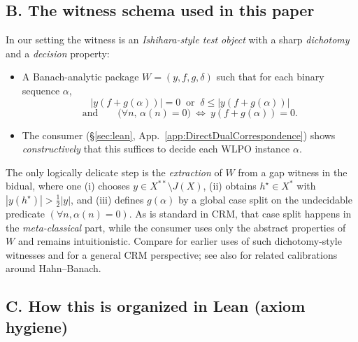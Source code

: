 \documentclass[11pt]{article}
\begin{document}
\subsection*{B. The witness schema used in this paper}

In our setting the witness is an \emph{Ishihara-style test object} with a sharp \emph{dichotomy} and a \emph{decision} property:
\begin{itemize}
\item A Banach-analytic package $W=(y,f,g,\delta)$ such that for each binary sequence $\alpha$,
\[
\big|y(f + g(\alpha))\big| = 0 \;\;\text{or}\;\; \delta \le \big|y(f + g(\alpha))\big|
\]
\[\text{and}\qquad
\big(\forall n,\,\alpha(n)=0\big)\ \Leftrightarrow\ y(f + g(\alpha))=0.
\]
\item The consumer (\S\ref{sec:lean}, App.~\ref{app:DirectDualCorrespondence}) shows \emph{constructively} that this suffices to decide each WLPO instance $\alpha$.
\end{itemize}

The only logically delicate step is the \emph{extraction} of $W$ from a gap witness in the bidual, where one (i) chooses $y\in X^{**}\setminus J(X)$, (ii) obtains $h^\star\in X^\ast$ with $|y(h^\star)|>\tfrac12|y|$, and (iii) defines $g(\alpha)$ by a global case split on the undecidable predicate $(\forall n, \alpha(n)=0)$. As is standard in CRM, that case split happens in the \emph{meta-classical} part, while the consumer uses only the abstract properties of $W$ and remains intuitionistic. Compare \cite{Ishihara90} for earlier uses of such dichotomy-style witnesses and \cite{DienerCRM} for a general CRM perspective; see also \cite{BrownSimpson86} for related calibrations around Hahn--Banach.

\subsection*{C. How this is organized in Lean (axiom hygiene)}
\end{document}

